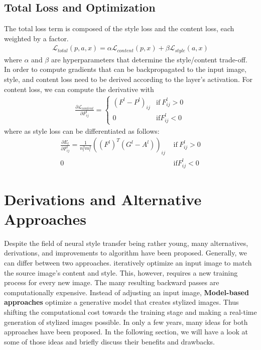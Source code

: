 \documentclass{seminar}
\begin{document}
	\subsection{Total Loss and Optimization}
	The total loss term is composed of the style loss and the content loss, each weighted by a factor.
	\begin{align*}
	\mathcal{L}_{total}(p, a, x) = \alpha \mathcal{L}_{content}(p,x) + \beta \mathcal{L}_{style}(a,x)
	\end{align*}
	where $\alpha$ and $\beta$ are hyperparameters that determine the style/content trade-off.\\
	In order to compute gradients that can be backpropagated to the input image, style, and content loss need to be derived according to the layer's activation. For content loss, we can compute the derivative with
	\begin{align*}
	\frac{\partial \mathcal{L}_{content}}{\partial F^l_{ij}} = 
	\begin{cases}
	(F^l-P^l)_{ij} & \text{if}\ F^l_{ij} > 0 \\
	0 & \text{if} F^l_{ij} <0
	\end{cases}
	\end{align*}
	where as style loss can be differentiated as follows:
	\begin{align*}
	\frac{\partial E_l}{\partial F^l_{ij}} =
	\frac{1}{n_l^2m_l^2}((F^l)^T (G^l-A^l))_{ij} & \text{ if}\ F^l_{ij} > 0 \\
	0 & \text{ if} F^l_{ij} < 0
	\end{align*}
	
	\section{Derivations and Alternative Approaches}
	Despite the field of neural style transfer being rather young, many alternatives, derivations, and improvements to \cite{gatys2015neural} algorithm have been proposed. Generally, we can differ between two approaches.  iteratively optimize an input image to match the source image's content and style. This, however, requires a new training process for every new image. The many resulting backward passes are computationally expensive. Instead of adjusting an input image, \textbf{Model-based approaches} optimize a generative model that creates stylized images. Thus shifting the computational cost towards the training stage and making a real-time generation of stylized images possible. In only a few years, many ideas for both approaches have been proposed. In the following section, we will have a look at some of those ideas and briefly discuss their benefits and drawbacks.
	
\end{document}
